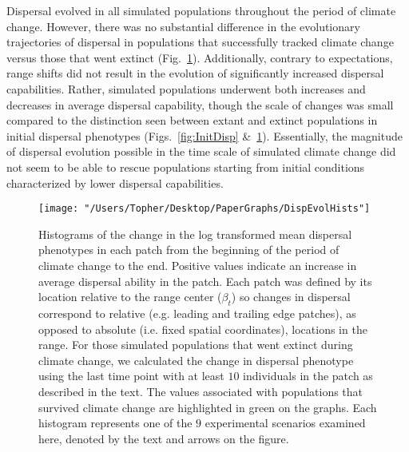 \documentclass[11pt, oneside]{article}
\begin{document}
Dispersal evolved in all simulated populations throughout the period of climate change. However, there was no substantial difference in the evolutionary trajectories of dispersal in populations that successfully tracked climate change versus those that went extinct (Fig.~\ref{fig:DispEvol}). Additionally, contrary to expectations, range shifts did not result in the evolution of significantly increased dispersal capabilities. Rather, simulated populations underwent both increases and decreases in average dispersal capability, though the scale of changes was small compared to the distinction seen between extant and extinct populations in initial dispersal phenotypes (Figs.~\ref{fig:InitDisp} \&~\ref{fig:DispEvol}). Essentially, the magnitude of dispersal evolution possible in the time scale of simulated climate change did not seem to be able to rescue populations starting from initial conditions characterized by lower dispersal capabilities.

\begin{figure}
\centering
\texttt{[image: "/Users/Topher/Desktop/PaperGraphs/DispEvolHists"]}
\vspace{-5mm}
\caption[LoF entry]{Histograms of the change in the log transformed mean dispersal phenotypes in each patch from the beginning of the period of climate change to the end. Positive values indicate an increase in average dispersal ability in the patch. Each patch was defined by its location relative to the range center ($\beta_{t}$) so changes in dispersal correspond to relative (e.g. leading and trailing edge patches), as opposed to absolute (i.e. fixed spatial coordinates), locations in the range.  For those simulated populations that went extinct during climate change, we calculated the change in dispersal phenotype using the last time point with at least $10$ individuals in the patch as described in the text. The values associated with populations that survived climate change are highlighted in green on the graphs. Each histogram represents one of the $9$ experimental scenarios examined here, denoted by the text and arrows on the figure.}
\label{fig:DispEvol}
\end{figure}
\end{document}
